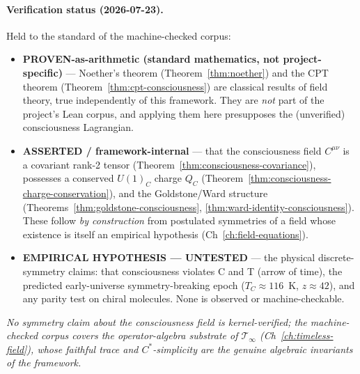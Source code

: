 \paragraph{Verification status (2026-07-23).}
Held to the standard of the machine-checked corpus:
\begin{itemize}
\item \textbf{PROVEN-as-arithmetic (standard mathematics, not project-specific)} --- Noether's theorem (Theorem~\ref{thm:noether}) and the CPT theorem (Theorem~\ref{thm:cpt-consciousness}) are classical results of field theory, true independently of this framework. They are \emph{not} part of the project's Lean corpus, and applying them here presupposes the (unverified) consciousness Lagrangian.
\item \textbf{ASSERTED / framework-internal} --- that the consciousness field $C^{\mu\nu}$ is a covariant rank-2 tensor (Theorem~\ref{thm:consciousness-covariance}), possesses a conserved $U(1)_C$ charge $Q_C$ (Theorem~\ref{thm:consciousness-charge-conservation}), and the Goldstone/Ward structure (Theorems~\ref{thm:goldstone-consciousness}, \ref{thm:ward-identity-consciousness}). These follow \emph{by construction} from postulated symmetries of a field whose existence is itself an empirical hypothesis (Ch~\ref{ch:field-equations}).
\item \textbf{EMPIRICAL HYPOTHESIS --- UNTESTED} --- the physical discrete-symmetry claims: that consciousness violates C and T (arrow of time), the predicted early-universe symmetry-breaking epoch ($T_C \approx 116$~K, $z \approx 42$), and any parity test on chiral molecules. None is observed or machine-checkable.
\end{itemize}
\emph{No symmetry claim about the consciousness field is kernel-verified; the machine-checked corpus covers the operator-algebra substrate of $\mathcal{T}_\infty$ (Ch~\ref{ch:timeless-field}), whose faithful trace and $C^*$-simplicity are the genuine algebraic invariants of the framework.}

